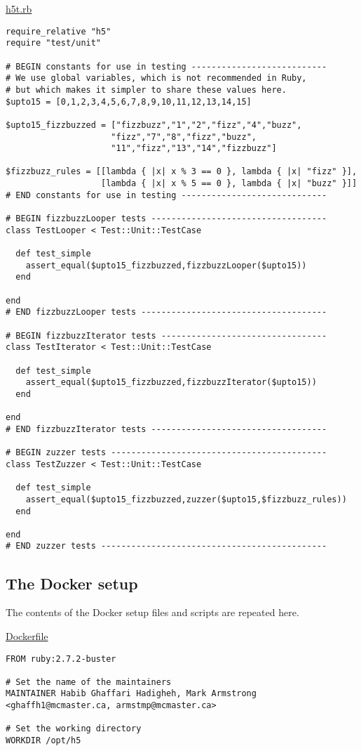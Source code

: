 \documentclass[11pt]{article}
\begin{document}
\href{./testing/h5/h5t.rb}{h5t.rb}
\begin{verbatim}
require_relative "h5"
require "test/unit"

# BEGIN constants for use in testing ---------------------------
# We use global variables, which is not recommended in Ruby,
# but which makes it simpler to share these values here.
$upto15 = [0,1,2,3,4,5,6,7,8,9,10,11,12,13,14,15]

$upto15_fizzbuzzed = ["fizzbuzz","1","2","fizz","4","buzz",
                     "fizz","7","8","fizz","buzz",
                     "11","fizz","13","14","fizzbuzz"]

$fizzbuzz_rules = [[lambda { |x| x % 3 == 0 }, lambda { |x| "fizz" }],
                   [lambda { |x| x % 5 == 0 }, lambda { |x| "buzz" }]]
# END constants for use in testing -----------------------------

# BEGIN fizzbuzzLooper tests -----------------------------------
class TestLooper < Test::Unit::TestCase

  def test_simple
    assert_equal($upto15_fizzbuzzed,fizzbuzzLooper($upto15))
  end

end
# END fizzbuzzLooper tests -------------------------------------

# BEGIN fizzbuzzIterator tests ---------------------------------
class TestIterator < Test::Unit::TestCase

  def test_simple
    assert_equal($upto15_fizzbuzzed,fizzbuzzIterator($upto15))
  end

end
# END fizzbuzzIterator tests -----------------------------------

# BEGIN zuzzer tests -------------------------------------------
class TestZuzzer < Test::Unit::TestCase

  def test_simple
    assert_equal($upto15_fizzbuzzed,zuzzer($upto15,$fizzbuzz_rules))
  end

end
# END zuzzer tests ---------------------------------------------
\end{verbatim}

\subsection*{The Docker setup}
\label{sec:org4fe10db}
The contents of the Docker setup files and scripts are repeated here.

\href{./testing/h5/Dockerfile}{Dockerfile}
\begin{verbatim}
FROM ruby:2.7.2-buster

# Set the name of the maintainers
MAINTAINER Habib Ghaffari Hadigheh, Mark Armstrong <ghaffh1@mcmaster.ca, armstmp@mcmaster.ca>

# Set the working directory
WORKDIR /opt/h5
\end{verbatim}
\end{document}
